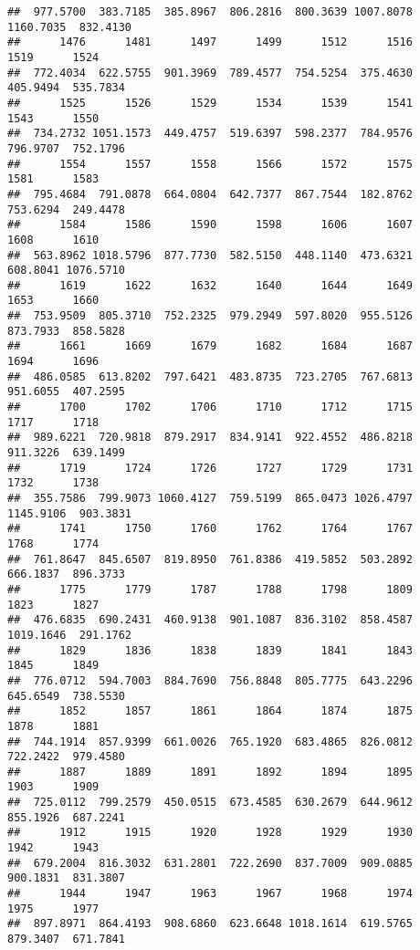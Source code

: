 \documentclass[
]{article}
\begin{document}
\begin{verbatim}
##  977.5700  383.7185  385.8967  806.2816  800.3639 1007.8078 1160.7035  832.4130 
##      1476      1481      1497      1499      1512      1516      1519      1524 
##  772.4034  622.5755  901.3969  789.4577  754.5254  375.4630  405.9494  535.7834 
##      1525      1526      1529      1534      1539      1541      1543      1550 
##  734.2732 1051.1573  449.4757  519.6397  598.2377  784.9576  796.9707  752.1796 
##      1554      1557      1558      1566      1572      1575      1581      1583 
##  795.4684  791.0878  664.0804  642.7377  867.7544  182.8762  753.6294  249.4478 
##      1584      1586      1590      1598      1606      1607      1608      1610 
##  563.8962 1018.5796  877.7730  582.5150  448.1140  473.6321  608.8041 1076.5710 
##      1619      1622      1632      1640      1644      1649      1653      1660 
##  753.9509  805.3710  752.2325  979.2949  597.8020  955.5126  873.7933  858.5828 
##      1661      1669      1679      1682      1684      1687      1694      1696 
##  486.0585  613.8202  797.6421  483.8735  723.2705  767.6813  951.6055  407.2595 
##      1700      1702      1706      1710      1712      1715      1717      1718 
##  989.6221  720.9818  879.2917  834.9141  922.4552  486.8218  911.3226  639.1499 
##      1719      1724      1726      1727      1729      1731      1732      1738 
##  355.7586  799.9073 1060.4127  759.5199  865.0473 1026.4797 1145.9106  903.3831 
##      1741      1750      1760      1762      1764      1767      1768      1774 
##  761.8647  845.6507  819.8950  761.8386  419.5852  503.2892  666.1837  896.3733 
##      1775      1779      1787      1788      1798      1809      1823      1827 
##  476.6835  690.2431  460.9138  901.1087  836.3102  858.4587 1019.1646  291.1762 
##      1829      1836      1838      1839      1841      1843      1845      1849 
##  776.0712  594.7003  884.7690  756.8848  805.7775  643.2296  645.6549  738.5530 
##      1852      1857      1861      1864      1874      1875      1878      1881 
##  744.1914  857.9399  661.0026  765.1920  683.4865  826.0812  722.2422  979.4580 
##      1887      1889      1891      1892      1894      1895      1903      1909 
##  725.0112  799.2579  450.0515  673.4585  630.2679  644.9612  855.1926  687.2241 
##      1912      1915      1920      1928      1929      1930      1942      1943 
##  679.2004  816.3032  631.2801  722.2690  837.7009  909.0885  900.1831  831.3807 
##      1944      1947      1963      1967      1968      1974      1975      1977 
##  897.8971  864.4193  908.6860  623.6648 1018.1614  619.5765  879.3407  671.7841 

\end{verbatim}
\end{document}
